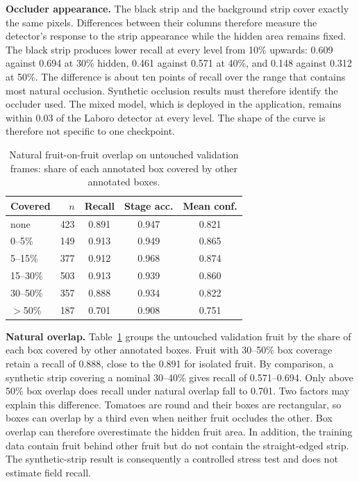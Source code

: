 \textbf{Occluder appearance.} The black strip and the background strip cover
exactly the same pixels. Differences between their columns therefore measure
the detector's response to the strip appearance while the hidden area remains
fixed. The black strip produces lower recall at every level from 10\% upwards:
0.609 against 0.694 at 30\% hidden, 0.461 against 0.571 at 40\%, and 0.148
against 0.312 at 50\%. The difference is about ten points of recall over the
range that contains most natural occlusion. Synthetic occlusion results must
therefore identify the occluder used. The mixed model, which is deployed in the
application, remains within 0.03 of the Laboro detector at every level. The
shape of the curve is therefore not specific to one checkpoint.

\begin{table}[t]
\centering
\caption{Natural fruit-on-fruit overlap on untouched validation frames: share
of each annotated box covered by other annotated boxes.}
\label{tab:natural-overlap}
\begin{tabular}{lrccc}
\toprule
Covered & $n$ & Recall & Stage acc. & Mean conf. \\
\midrule
none       & 423 & 0.891 & 0.947 & 0.821 \\
0--5\%     & 149 & 0.913 & 0.949 & 0.865 \\
5--15\%    & 377 & 0.912 & 0.968 & 0.874 \\
15--30\%   & 503 & 0.913 & 0.939 & 0.860 \\
30--50\%   & 357 & 0.888 & 0.934 & 0.822 \\
$>$50\%    & 187 & 0.701 & 0.908 & 0.751 \\
\bottomrule
\end{tabular}
\end{table}

\textbf{Natural overlap.} Table~\ref{tab:natural-overlap} groups the untouched
validation fruit by the share of each box covered by other annotated boxes.
Fruit with 30--50\% box coverage retain a recall of 0.888, close to the 0.891
for isolated fruit. By comparison, a synthetic strip covering a nominal
30--40\% gives recall of 0.571--0.694. Only above 50\% box overlap does recall
under natural overlap fall to 0.701. Two factors may explain this
difference. Tomatoes are round and their boxes are rectangular, so boxes can
overlap by a third even when neither fruit occludes the other. Box overlap can
therefore overestimate the hidden fruit area. In addition, the training data
contain fruit behind other fruit but do not contain the straight-edged strip.
The synthetic-strip result is consequently a controlled stress test and does
not estimate field recall.

